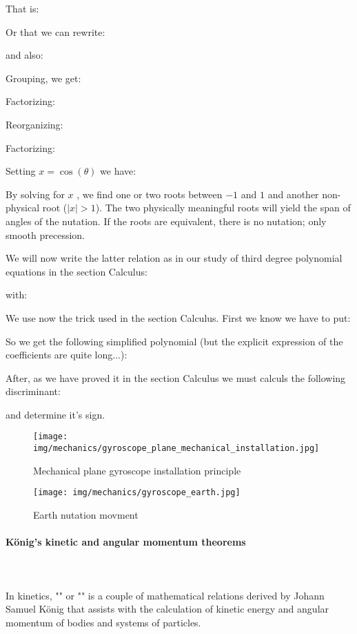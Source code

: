 	That is:
	
	Or that we can rewrite:
	
	and also:
	
	Grouping, we get:
	
	Factorizing:
	
	Reorganizing:
	
	Factorizing:
	
	
	Setting $x=\cos(\theta)$ we have:
	
	By solving for $x$ , we find one or two roots between $-1$ and $1$ and another non-physical root ($|x| > 1$).
The two physically meaningful roots will yield the span of angles of the nutation. If the roots are equivalent, there
is no nutation; only smooth precession.

	We will now write the latter relation as in our study of third degree polynomial equations in the section Calculus:
	
	with:
	
	We use now the trick used in the section Calculus. First we know we have to put:
	
	So we get the following simplified polynomial (but the explicit expression of the coefficients are quite long...):
	
	 After, as we have proved it in the section Calculus we must calculs the following discriminant:
	
	and determine it's sign.
	
	
	\begin{figure}[H]
		\centering
		\texttt{[image: img/mechanics/gyroscope\_plane\_mechanical\_installation.jpg]}
		\caption[]{Mechanical plane gyroscope installation principle}
	\end{figure}
	\begin{figure}[H]
		\centering
		\texttt{[image: img/mechanics/gyroscope\_earth.jpg]}
		\caption[]{Earth nutation movment}
	\end{figure}
	
	\paragraph{König's kinetic and angular momentum theorems}\mbox{}\\\\
	In kinetics, "" or "" is a couple of mathematical relations derived by Johann Samuel König that assists with the calculation of kinetic energy and angular momentum of bodies and systems of particles.
	

